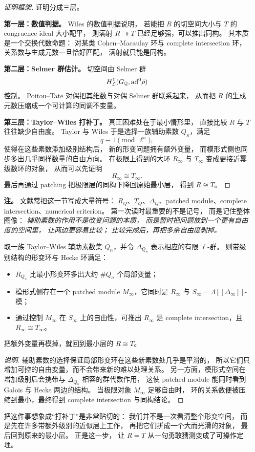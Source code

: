 \begin{proof}[证明框架]
证明分成三层。

\textbf{第一层：数值判据。}
Wiles 的数值判据说明，
若能把 $R$ 的切空间大小与 $T$ 的 congruence ideal 大小配平，
则满射 $R\twoheadrightarrow T$ 已经足够强，可以推出同构。
其本质是一个交换代数命题：
对某类 Cohen--Macaulay 环与 complete intersection 环，
关系数与生成元数一旦恰好匹配，
满射就只能是同构。

\textbf{第二层：Selmer 群估计。}
切空间由 Selmer 群
\[
  H^1_{\mathcal L}(G_{\mathbb{Q}},\mathrm{ad}^0\bar{\rho})
\]
控制。
Poitou--Tate 对偶把其维数与对偶 Selmer 群联系起来，
从而把 $R$ 的生成元数压缩成一个可计算的同调不变量。

\textbf{第三层：Taylor--Wiles 打补丁。}
真正困难处在于最小情形里，
直接比较 $R$ 与 $T$ 往往缺少自由度。
Taylor 与 Wiles 于是选择一族辅助素数 $Q_n$，满足
\[
  q\equiv 1\pmod{\ell^n},
\]
使得在这些素数添加级别结构后，
新的形变问题拥有额外变量，
而模形式侧也同步多出几乎同样数量的自由方向。
在极限上得到的大环 $R_\infty$ 与 $T_\infty$ 变成更接近幂级数环的对象，
从而可以先证明
\[
  R_\infty\cong T_\infty.
\]
最后再通过 patching 把极限层的同构下降回原始最小层，
得到 $R\cong T$。
\end{proof}

\textbf{注。}
文献常把这一节写成大量符号：
$R_Q$、$T_Q$、$\Delta_Q$、patched module、complete intersection、numerical criterion。
第一次读时最重要的不是记号，
而是记住整体图像：
\emph{辅助素数的作用不是改变问题的本质，
而是暂时把问题放到一个更有自由度的空间里，
让两边更容易比较；
比较完成后，再把多余自由度剥掉。}

\begin{proposition}
\label{prop:ch10-patching-details}
取一族 Taylor--Wiles 辅助素数集 $Q_n$，并令 $\Delta_{Q_n}$ 表示相应的有限 $\ell$-群。
则带级别结构的形变环与 Hecke 环满足：
\begin{itemize}
  \item $R_{Q_n}$ 比最小形变环多出大约 $\#Q_n$ 个局部变量；
  \item 模形式侧存在一个 patched module $M_\infty$，它同时是 $R_\infty$ 与 $S_\infty=\Lambda[[\Delta_\infty]]$-模；
  \item 通过控制 $M_\infty$ 在 $S_\infty$ 上的自由性，可推出 $R_\infty$ 是 complete intersection，且 $R_\infty\cong T_\infty$。
\end{itemize}
把额外变量再模掉，就回到最小层的 $R\cong T$。
\end{proposition}

\begin{proof}[说明]
辅助素数的选择保证局部形变环在这些新素数处几乎是平滑的，
所以它们只增加可控的自由变量，而不会带来新的难以处理关系。
另一方面，模形式空间在增加级别后会携带与 $\Delta_{Q_n}$ 相容的群代数作用，
这使 patched module 能同时看到 Galois 与 Hecke 两边的结构。
当极限对象 $M_\infty$ 足够自由时，
环的关系数便被压缩到最小，最终得到 complete intersection 与同构结论。
\end{proof}

把这件事想象成“打补丁”是非常贴切的：
我们并不是一次看清整个形变空间，
而是先在许多带额外级别的近似层上工作，
再把它们拼成一个大而光滑的对象，
最后回到原来的最小层。
正是这一步，
让 $R=T$ 从一句勇敢猜测变成了可操作定理。

